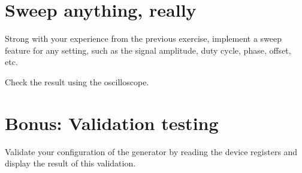 \documentclass{labo}
\begin{document}
\section{Sweep anything, really}
Strong with your experience from the previous exercise, implement a sweep feature for any setting, such as the signal amplitude, duty cycle, phase, offset, etc.

Check the result using the oscilloscope.









\section{Bonus: Validation testing}
Validate your configuration of the generator by reading the device registers and display the result of this validation.









\end{document}
